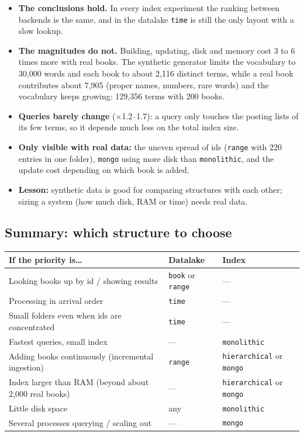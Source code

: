 \documentclass[11pt,a4paper]{article}
\newcommand{\code}[1]{\texttt{#1}}
\begin{document}
\begin{itemize}
  \item \textbf{The conclusions hold.} In every index experiment the ranking between backends is the
        same, and in the datalake \code{time} is still the only layout with a slow lookup.
  \item \textbf{The magnitudes do not.} Building, updating, disk and memory cost 3 to 6 times more
        with real books. The synthetic generator limits the vocabulary to 30,000 words and each book
        to about 2,116 distinct terms, while a real book contributes about 7,905 (proper names,
        numbers, rare words) and the vocabulary keeps growing: 129,356 terms with 200 books.
  \item \textbf{Queries barely change} ($\times$1.2--1.7): a query only touches the posting lists of
        its few terms, so it depends much less on the total index size.
  \item \textbf{Only visible with real data:} the uneven spread of ids (\code{range} with 220
        entries in one folder), \code{mongo} using more disk than \code{monolithic}, and the update
        cost depending on which book is added.
  \item \textbf{Lesson:} synthetic data is good for comparing structures with each other; sizing a
        system (how much disk, RAM or time) needs real data.
\end{itemize}

\subsection{Summary: which structure to choose}
\begin{table}[H]
\centering\small
\begin{tabularx}{\linewidth}{@{}Y l l@{}}
\toprule
If the priority is\ldots & Datalake & Index \\
\midrule
Looking books up by id / showing results & \code{book} or \code{range} & --- \\
Processing in arrival order & \code{time} & --- \\
Small folders even when ids are concentrated & \code{time} & --- \\
Fastest queries, small index & --- & \code{monolithic} \\
Adding books continuously (incremental ingestion) & \code{range} & \code{hierarchical} or \code{mongo} \\
Index larger than RAM (beyond about 2,000 real books) & --- & \code{hierarchical} or \code{mongo} \\
Little disk space & any & \code{monolithic} \\
Several processes querying / scaling out & --- & \code{mongo} \\
\bottomrule
\end{tabularx}
\end{table}
\end{document}
